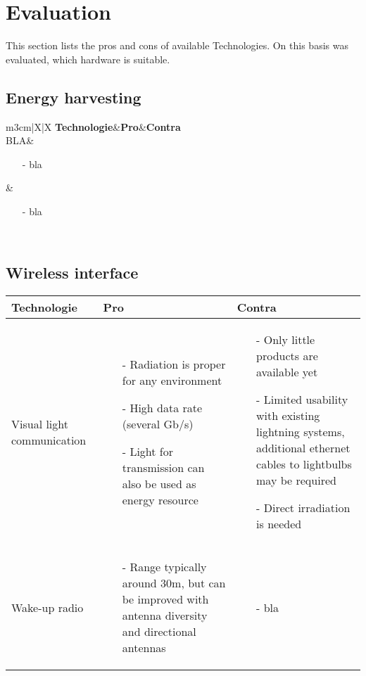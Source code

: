\section{Evaluation}
This section lists the pros and cons of available Technologies.
On this basis was evaluated, which hardware is suitable.

\subsection{Energy harvesting}
\begin{tabularx}{\linewidth}{m{3cm}|X|X}
	\textbf{Technologie}&\textbf{Pro}&\textbf{Contra}\\
	\hline
	BLA&
	\begin{itemize}
		\item[-] bla
	\end{itemize}&
	\begin{itemize}
		\item[-] bla
	\end{itemize}\\
	\hline	
\end{tabularx}


\subsection{Wireless interface}
\begin{tabularx}{\linewidth}{m{3cm}|X|X}
	\textbf{Technologie}&\textbf{Pro}&\textbf{Contra}\\
	\hline
	Visual light communication&
	\begin{itemize}
		\item[-] Radiation is proper for any environment
		\item[-] High data rate (several Gb/s)
		\item[-] Light for transmission can also be used as energy resource
	\end{itemize}&
	\begin{itemize}
		\item[-] Only little products are available yet
		\item[-] Limited usability with existing lightning systems,  additional ethernet cables to lightbulbs may be required
		\item[-] Direct irradiation is needed
	\end{itemize}\\
	\hline
	Wake-up radio&
	\begin{itemize}
		\item[-] Range typically around 30m, but can be improved with antenna diversity and directional antennas
	\end{itemize}&
	\begin{itemize}
		\item[-] bla
	\end{itemize}\\	
\end{tabularx}


